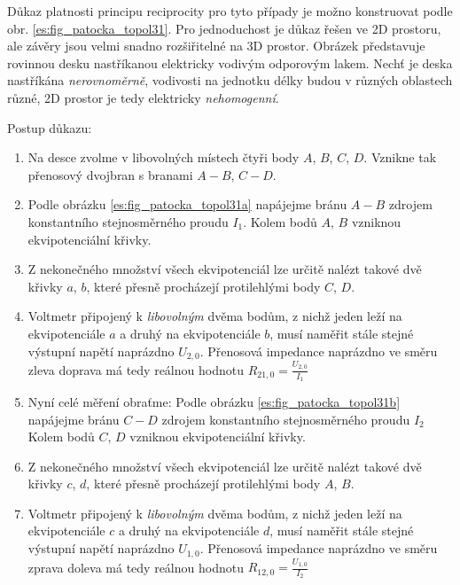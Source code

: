         Důkaz platnosti principu reciprocity pro tyto případy je možno konstruovat podle obr. 
        \ref{es:fig_patocka_topol31}. Pro jednoduchost je důkaz řešen ve 2D prostoru, ale závěry 
        jsou velmi snadno rozšiřitelné na 3D prostor. Obrázek představuje rovinnou desku 
        nastříkanou elektricky vodivým odporovým lakem. Nechť je deska nastříkána 
        \emph{nerovnoměrně}, vodivosti na jednotku délky budou v různých oblastech různé, 2D 
        prostor je tedy elektricky \emph{nehomogenní}.
        
        Postup důkazu:
        \begin{enumerate}
          \item Na desce zvolme v libovolných místech čtyři body \(A\), \(B\), \(C\), \(D\).    
                Vznikne tak přenosový dvojbran s branami \(A-B\), \(C-D\).
          
          \item Podle obrázku \ref{es:fig_patocka_topol31a} napájejme bránu \(A-B\) zdrojem 
                konstantního stejnosměrného proudu \(I_1\). Kolem bodů \(A\), \(B\) vzniknou 
                ekvipotenciální křivky.
          
          \item Z nekonečného množství všech ekvipotenciál lze určitě nalézt takové dvě křivky 
               \(a\), \(b\), které přesně procházejí protilehlými body \(C\), \(D\).
          
          \item Voltmetr připojený k \emph{libovolným} dvěma bodům, z nichž jeden leží na 
                ekvipotenciále \(a\) a druhý na ekvipotenciále \(b\), musí naměřit stále stejné 
                výstupní napětí naprázdno \(U_{2,0}\). Přenosová impedance naprázdno ve směru zleva 
                doprava má tedy reálnou hodnotu \(R_{21,0} = \frac{U_{2,0}}{I_1}\)
          
          \item Nyní celé měření obraťme: Podle obrázku \ref{es:fig_patocka_topol31b} napájejme 
                bránu \(C-D\) zdrojem konstantního stejnosměrného proudu \(I_2\) Kolem bodů \(C\), 
                \(D\) vzniknou ekvipotenciální křivky.
          
          \item Z nekonečného množství všech ekvipotenciál lze určitě nalézt takové dvě křivky 
                \(c\), \(d\), které přesně procházejí protilehlými body \(A\), \(B\).
          
          \item Voltmetr připojený k \emph{libovolným} dvěma bodům, z nichž jeden leží na 
                ekvipotenciále \(c\) a druhý na ekvipotenciále \(d\), musí naměřit stále stejné 
                výstupní napětí naprázdno \(U_{1,0}\). Přenosová impedance naprázdno ve směru 
                zprava doleva má tedy reálnou hodnotu \(R_{12,0} = \frac{U_{1,0}}{I_2}\)
          

\end{enumerate}
